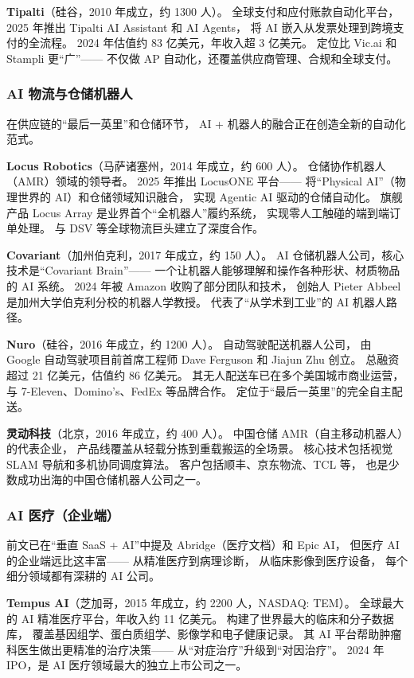 \textbf{Tipalti}（硅谷，2010 年成立，约 1300 人）。
全球支付和应付账款自动化平台，
2025 年推出 Tipalti AI Assistant 和 AI Agents，
将 AI 嵌入从发票处理到跨境支付的全流程。
2024 年估值约 83 亿美元，年收入超 3 亿美元。
定位比 Vic.ai 和 Stampli 更``广''——
不仅做 AP 自动化，还覆盖供应商管理、合规和全球支付。

\subsubsection{AI 物流与仓储机器人}

在供应链的``最后一英里''和仓储环节，
AI + 机器人的融合正在创造全新的自动化范式。

\textbf{Locus Robotics}（马萨诸塞州，2014 年成立，约 600 人）。
仓储协作机器人（AMR）领域的领导者。
2025 年推出 LocusONE 平台——
将``Physical AI''（物理世界的 AI）和仓储领域知识融合，
实现 Agentic AI 驱动的仓储自动化。
旗舰产品 Locus Array 是业界首个``全机器人''履约系统，
实现零人工触碰的端到端订单处理。
与 DSV 等全球物流巨头建立了深度合作。

\textbf{Covariant}（加州伯克利，2017 年成立，约 150 人）。
AI 仓储机器人公司，核心技术是``Covariant Brain''——
一个让机器人能够理解和操作各种形状、材质物品的 AI 系统。
2024 年被 Amazon 收购了部分团队和技术，
创始人 Pieter Abbeel 是加州大学伯克利分校的机器人学教授。
代表了``从学术到工业''的 AI 机器人路径。

\textbf{Nuro}（硅谷，2016 年成立，约 1200 人）。
自动驾驶配送机器人公司，
由 Google 自动驾驶项目前首席工程师 Dave Ferguson 和 Jiajun Zhu 创立。
总融资超过 21 亿美元，估值约 86 亿美元。
其无人配送车已在多个美国城市商业运营，
与 7-Eleven、Domino's、FedEx 等品牌合作。
定位于``最后一英里''的完全自主配送。

\textbf{灵动科技}（北京，2016 年成立，约 400 人）。
中国仓储 AMR（自主移动机器人）的代表企业，
产品线覆盖从轻载分拣到重载搬运的全场景。
核心技术包括视觉 SLAM 导航和多机协同调度算法。
客户包括顺丰、京东物流、TCL 等，
也是少数成功出海的中国仓储机器人公司之一。

\subsubsection{AI 医疗（企业端）}

前文已在``垂直 SaaS + AI''中提及 Abridge（医疗文档）和 Epic AI，
但医疗 AI 的企业端远比这丰富——
从精准医疗到病理诊断，
从临床影像到医疗设备，
每个细分领域都有深耕的 AI 公司。

\textbf{Tempus AI}（芝加哥，2015 年成立，约 2200 人，NASDAQ: TEM）。
全球最大的 AI 精准医疗平台，年收入约 11 亿美元。
构建了世界最大的临床和分子数据库，
覆盖基因组学、蛋白质组学、影像学和电子健康记录。
其 AI 平台帮助肿瘤科医生做出更精准的治疗决策——
从``对症治疗''升级到``对因治疗''。
2024 年 IPO，是 AI 医疗领域最大的独立上市公司之一。

